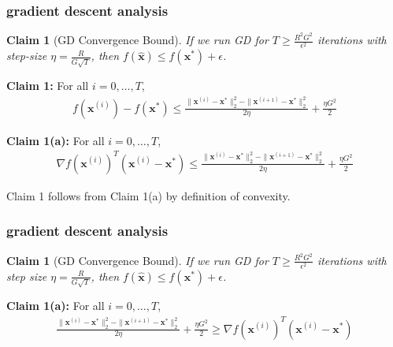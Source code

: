 \documentclass[compress]{beamer}
\newcommand{\bs}[1]{\boldsymbol{#1}}
\newcommand{\bv}[1]{\mathbf{#1}}
\newtheorem{claim}[theorem]{Claim}
\begin{document}
\begin{frame}[t]
	\frametitle{gradient descent analysis}
	\small
	\begin{claim}[GD Convergence Bound]
		If we run GD for $T \geq \frac{R^2G^2}{\epsilon^2}$ iterations with step-size $\eta = \frac{R}{G\sqrt{T}}$, then $f(\hat{\bv{x}}) \leq f(\bv{x}^*) + \epsilon$.
	\end{claim}
	\textbf{Claim 1:} For all $i = 0, \ldots, T$, 
	\begin{align*}
		f(\bv{x}^{(i)}) - f(\bv{x}^*) \leq \frac{\|\bs{x}^{(i)} - \bs{x}^*\|_2^2 - \|\bs{x}^{(i+1)} -\bs{x}^*\|_2^2}{2\eta} + \frac{\eta G^2}{2}
	\end{align*}
	
	\textbf{Claim 1(a):} For all $i = 0, \ldots, T$, 
	\begin{align*}
		\nabla f(\bv{x}^{(i)})^T(\bs{x}^{(i)} - \bs{x}^{*})  \leq \frac{\|\bs{x}^{(i)} - \bs{x}^*\|_2^2 - \|\bs{x}^{(i+1)} -\bs{x}^*\|_2^2}{2\eta} + \frac{\eta G^2}{2}
	\end{align*}
	
	Claim 1 follows from Claim 1(a) by definition of convexity.
\end{frame}

\begin{frame}[t]
	\frametitle{gradient descent analysis}
	\small
	\begin{claim}[GD Convergence Bound]
		If we run GD for $T \geq \frac{R^2G^2}{\epsilon^2}$ iterations with step size $\eta = \frac{R}{G\sqrt{T}}$, then $f(\hat{\bv{x}}) \leq f(\bv{x}^*) + \epsilon$.
	\end{claim}
	\textbf{Claim 1(a):} For all $i = 0, \ldots, T$, 
	\begin{align*}
		 \frac{\|\bv{x}^{(i)} - \bv{x}^*\|_2^2 - \|\bv{x}^{(i+1)} -\bv{x}^*\|_2^2}{2\eta} + \frac{\eta G^2}{2} \geq \nabla f(\bv{x}^{(i)})^T(\bv{x}^{(i)} - \bv{x}^{*})
	\end{align*}
\end{frame}
\end{document}
